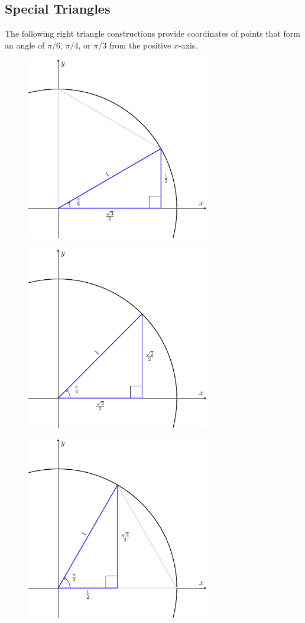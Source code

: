 \documentclass{article}
\begin{document}
\subsection{Special Triangles}
The following right triangle constructions provide coordinates of
points that form an angle of \(\pi/6\), \(\pi/4\), or \(\pi/3\) from
the positive \(x\)-axis.
\begin{figure}[H]
    \centering
    \includegraphics[width=8cm]{figures/unit-circle-30.pdf}
\end{figure}
\begin{figure}[H]
    \centering
    \includegraphics[width=8cm]{figures/unit-circle-45.pdf}
\end{figure}
\begin{figure}[H]
    \centering
    \includegraphics[width=8cm]{figures/unit-circle-60.pdf}
\end{figure}
\end{document}
